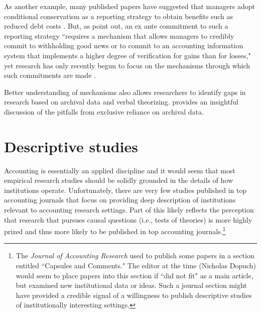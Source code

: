 \documentclass[11pt,reqno,titlepage]{amsart}
\begin{document}
\begin{doublespace}
As another example, many published papers have suggested that managers adopt conditional conservatism as a reporting strategy to obtain benefits such as reduced debt costs \citep{Ahmed:2002aa,Zhang:2008bc}.
But, as \citet[p\,317]{Beyer:2010cj} point out, an ex ante commitment to such a reporting strategy ``requires a mechanism that allows managers to credibly commit to withholding good news or to commit to an accounting information system that implements a higher degree of verification for gains than for losses," yet research has only recently begun to focus on the mechanisms through which such commitments are made \citep[e.g.,][]{Erkens:2014hj}.

Better understanding of mechanisms also allows researchers to identify gaps in research based on archival data and verbal theorizing.
\cite{Soltes:2014gr} provides an insightful discussion of the pitfalls from exclusive reliance on archival data. 




\section{Descriptive studies} \label{sec:desc}

Accounting is essentially an applied discipline and it would seem that most empirical research studies should be solidly grounded in the details of how institutions operate.
Unfortunately, there are very few studies published in top accounting journals that focus on providing deep description of institutions relevant to accounting research settings.
Part of this likely reflects the perception that research that pursues causal questions (i.e., tests of theories) is more highly prized and thus more likely to be published in top accounting journals.\footnote{
The \emph{Journal of Accounting Research} used to publish some papers in a section entitled ``Capsules and Comments."
The editor at the time (Nicholas Dopuch) would seem to place papers into this section if ``did not fit" as a main article, but examined new institutional data or ideas. 
Such a journal section might have provided a credible signal of a willingness to publish descriptive studies of institutionally interesting settings.}


\end{doublespace}
\end{document}
